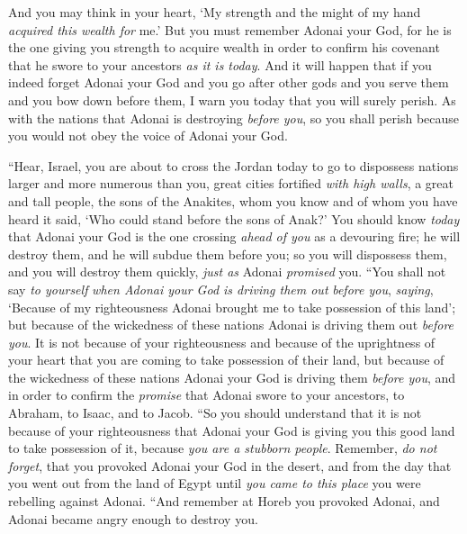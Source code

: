 \begin{biblechapter}
\verse And you may think in your heart, ‘My strength and the might of my hand \textit{acquired this wealth for} me.’
\verse But you must remember Adonai your God, for he is the one giving you strength to acquire wealth in order to confirm his covenant that he swore to your ancestors \textit{as it is today}.
\verse And it will happen that if you indeed forget Adonai your God and you go after other gods and you serve them and you bow down before them, I warn you today that you will surely perish.
\verse As with the nations that Adonai is destroying \textit{before you}, so you shall perish because you would not obey the voice of Adonai your God.
\end{biblechapter}

\begin{biblechapter} %
\verse “Hear, Israel, you are about to cross the Jordan today to go to dispossess nations larger and more numerous than you, great cities fortified \textit{with high walls},
\verse a great and tall people, the sons of the Anakites, whom you know and of whom you have heard it said, ‘Who could stand before the sons of Anak?’
\verse You should know \textit{today} that Adonai your God is the one crossing \textit{ahead of you} as a devouring fire; he will destroy them, and he will subdue them before you; so you will dispossess them, and you will destroy them quickly, \textit{just as} Adonai \textit{promised} you.
\verse “You shall not say \textit{to yourself} \textit{when Adonai your God is driving them out} \textit{before you}, \textit{saying}, ‘Because of my righteousness Adonai brought me to take possession of this land’; but because of the wickedness of these nations Adonai is driving them out \textit{before you}.
\verse It is not because of your righteousness and because of the uprightness of your heart that you are coming to take possession of their land, but because of the wickedness of these nations Adonai your God is driving them \textit{before you}, and in order to confirm the \textit{promise} that Adonai swore to your ancestors, to Abraham, to Isaac, and to Jacob.
\verse “So you should understand that it is not because of your righteousness that Adonai your God is giving you this good land to take possession of it, because \textit{you are a stubborn people}. 
\verse Remember, \textit{do not forget}, that you provoked Adonai your God in the desert, and from the day that you went out from the land of Egypt until \textit{you came to this place} you were rebelling against Adonai.
\verse “And remember at Horeb you provoked Adonai, and Adonai became angry enough to destroy you.

\end{biblechapter}
